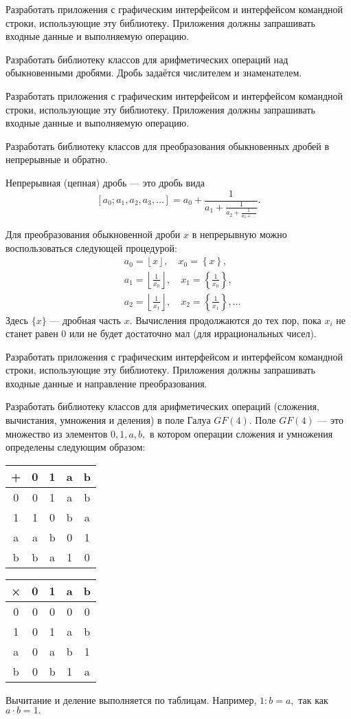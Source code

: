Разработать приложения с графическим интерфейсом и интерфейсом
командной строки, использующие эту библиотеку. Приложения должны
запрашивать входные данные и выполняемую операцию.

\task Разработать библиотеку классов для арифметических операций над
обыкновенными дробями. Дробь задаётся числителем и знаменателем.

Разработать приложения с графическим интерфейсом и интерфейсом
командной строки, использующие эту библиотеку. Приложения должны
запрашивать входные данные и выполняемую операцию.

\task Разработать библиотеку классов для преобразования обыкновенных
дробей в непрерывные и обратно.

Непрерывная (цепная) дробь — это дробь вида
\[
[a_0; a_1, a_2, a_3, \dots] = a_0 + \frac1{a_1 + \frac1{a_2 + \frac1{a_3 + \dots}}}.
\]

Для преобразования обыкновенной дроби $x$ в непрерывную можно
воспользоваться следующей процедурой:
\begin{align*}
&a_0 = \left\lfloor x \right\rfloor,\quad x_0 = \left\{x\right\},\\
&a_1 = \left\lfloor \frac1{x_0} \right\rfloor,\quad x_1 = \left\{\frac1{x_0}\right\},\\
&a_2 = \left\lfloor \frac1{x_1} \right\rfloor,\quad x_2 = \left\{\frac1{x_1}\right\}, \dots
\end{align*}
Здесь $\{x\}$ — дробная часть $x$. Вычисления продолжаются до тех пор,
пока $x_i$ не станет равен $0$ или не будет достаточно мал (для
иррациональных чисел).

Разработать приложения с графическим интерфейсом и интерфейсом
командной строки, использующие эту библиотеку. Приложения должны
запрашивать входные данные и направление преобразования.

\task Разработать библиотеку классов для арифметических операций
(сложения, вычистания, умножения и деления) в поле Галуа $GF(4)$. Поле
$GF(4)$ — это множество из элементов ${0, 1, a, b},$ в котором
операции сложения и умножения определены следующим образом:

\begin{table}
  \parbox{.45\linewidth}{
    \centering
    \begin{tabular}{c|cccc}
      +&0&1&a&b\\
      \hline
      0&0&1&a&b\\
      1&1&0&b&a\\
      a&a&b&0&1\\
      b&b&a&1&0
    \end{tabular}
  }
  \hfill
  \parbox{.45\linewidth}{
    \centering
    \begin{tabular}{c|cccc}
      ×&0&1&a&b\\
      \hline
      0&0&0&0&0\\
      1&0&1&a&b\\
      a&0&a&b&1\\
      b&0&b&1&a
    \end{tabular}
  }
\end{table}
Вычитание и деление выполняется по таблицам. Например, $1:b = a,$ так
как $a\cdot b=1.$

